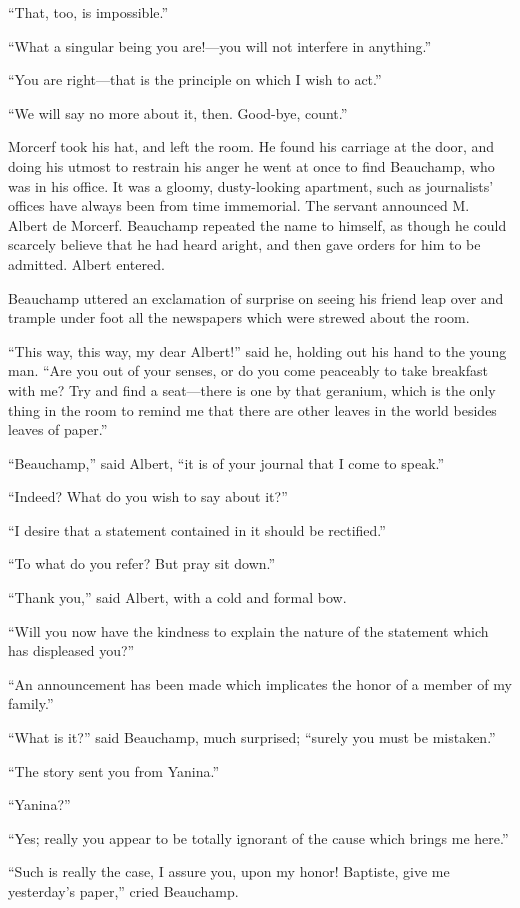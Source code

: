 “That, too, is impossible.”

“What a singular being you are!—you will not interfere in anything.”

“You are right—that is the principle on which I wish to act.”

“We will say no more about it, then. Good-bye, count.”

Morcerf took his hat, and left the room. He found his carriage at the
door, and doing his utmost to restrain his anger he went at once to
find Beauchamp, who was in his office. It was a gloomy, dusty-looking
apartment, such as journalists’ offices have always been from time
immemorial. The servant announced M. Albert de Morcerf. Beauchamp
repeated the name to himself, as though he could scarcely believe that
he had heard aright, and then gave orders for him to be admitted.
Albert entered.

Beauchamp uttered an exclamation of surprise on seeing his friend leap
over and trample under foot all the newspapers which were strewed about
the room.

“This way, this way, my dear Albert!” said he, holding out his hand to
the young man. “Are you out of your senses, or do you come peaceably to
take breakfast with me? Try and find a seat—there is one by that
geranium, which is the only thing in the room to remind me that there
are other leaves in the world besides leaves of paper.”

“Beauchamp,” said Albert, “it is of your journal that I come to speak.”

“Indeed? What do you wish to say about it?”

“I desire that a statement contained in it should be rectified.”

“To what do you refer? But pray sit down.”

“Thank you,” said Albert, with a cold and formal bow.

“Will you now have the kindness to explain the nature of the statement
which has displeased you?”

“An announcement has been made which implicates the honor of a member
of my family.”

“What is it?” said Beauchamp, much surprised; “surely you must be
mistaken.”

“The story sent you from Yanina.”

“Yanina?”

“Yes; really you appear to be totally ignorant of the cause which
brings me here.”

“Such is really the case, I assure you, upon my honor! Baptiste, give
me yesterday’s paper,” cried Beauchamp.


